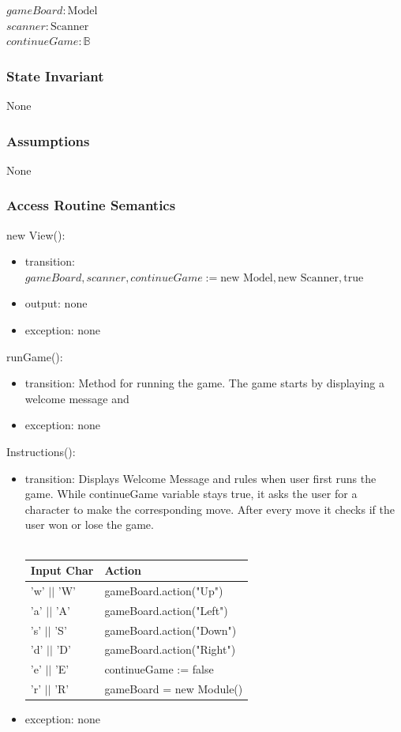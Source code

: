 \documentclass[12pt]{article}
\begin{document}
$\mathit{gameBoard}: \text{Model}$\\
$\mathit{scanner}: \text{Scanner}$\\
$\mathit{continueGame}: \mathbb{B}$

\subsubsection* {State Invariant}

None

\subsubsection* {Assumptions}

None

\subsubsection* {Access Routine Semantics}

\noindent new View():
\begin{itemize}
\item transition: $\mathit{gameBoard}, \mathit{scanner}, \mathit{continueGame} := \text{new Model}, \text{new Scanner}, \text{true} $
\item output: none
\item exception: none
\end{itemize}

\noindent runGame():
\begin{itemize}
\item transition: Method for running the game. The game starts by displaying a welcome message and 
\item exception: none
\end{itemize}

\noindent Instructions():
\begin{itemize}
\item transition: Displays Welcome Message and rules when user first runs the game. While continueGame variable stays true, it asks the user for a character to make the corresponding move. After every move it checks if the user won or lose the game.\\\\
\begin{tabular}{| l | l |}
\hline
\textbf{Input Char} & \textbf{Action}\\
\hline
'w' $||$ 'W' & gameBoard.action("Up") \\
\hline
\hline
'a' $||$ 'A' & gameBoard.action("Left") \\
\hline
\hline
's' $||$ 'S' & gameBoard.action("Down") \\
\hline
\hline
'd' $||$ 'D' & gameBoard.action("Right") \\
\hline
\hline
'e' $||$ 'E' & continueGame := false \\
\hline
\hline
'r' $||$ 'R' & gameBoard = new Module() \\
\hline
\end{tabular}

\item exception: none
\end{itemize}
\end{document}
